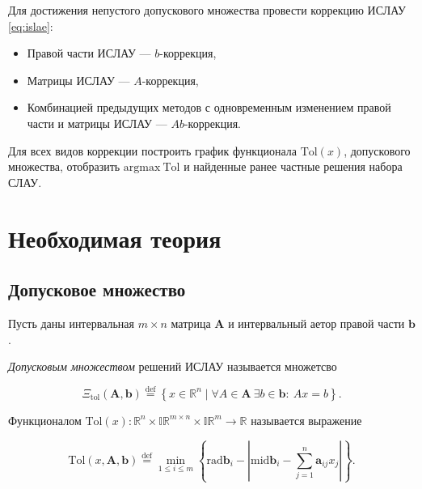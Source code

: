 \documentclass{article}
\begin{document}
  Для достижения непустого допускового множества провести коррекцию ИСЛАУ
  \ref{eq:islae}:

  \begin{itemize}
    \item Правой части ИСЛАУ --- \( b \)-коррекция,
    \item Матрицы ИСЛАУ --- \( A \)-коррекция,
    \item Комбинацией предыдущих методов с одновременным изменением
      правой части и матрицы ИСЛАУ — \( Ab \)-коррекция.
  \end{itemize}

  Для всех видов коррекции построить график функционала
  \( \text{Tol} (x) \), допускового множества, отобразить
  \( \text{argmax} \ \text{Tol} \) и найденные ранее частные решения набора
  СЛАУ.

  \section{Необходимая теория}

  \subsection{Допусковое множество}

  Пусть даны интервальная \( m \times n \) матрица \( \mathbf{A} \) и
  интервальный аетор правой части \( \mathbf{b} \).

  \vspace{\baselineskip}

  \emph{Допусковым множеством} решений ИСЛАУ называется множетсво

  \begin{equation} \label{eq:tol_set_of_solutions}
    \Xi_{\text{tol}} (\mathbf{A}, \mathbf{b}) \stackrel{\text{def}}{=}
      \left \{ x \in \mathbb{R}^n \mid \forall A \in \mathbf{A} \ \exists b \in \mathbf{b}: \ Ax = b \right \}.
  \end{equation}

  \vspace{\baselineskip}

  Функционалом \( \text{Tol} (x): \mathbb{R}^n \times \mathbb{IR}^{m \times n} \times \mathbb{IR}^m \to \mathbb{R} \)
  называется выражение

  \begin{equation} \label{eq:tol}
    \text{Tol} (x, \mathbf{A}, \mathbf{b}) \stackrel{\text{def}}{=}
      \min_{1 \leq i \leq m} \left \{ \text{rad} \mathbf{b}_i - \left | \text{mid} \mathbf{b}_i - \sum_{j=1}^n \mathbf{a}_{ij} x_j \right | \right \}.
  \end{equation}
\end{document}
